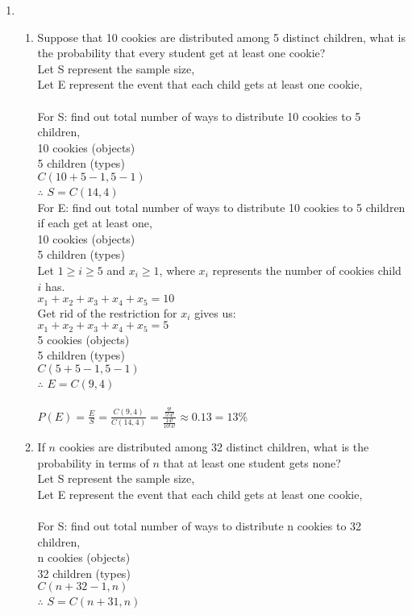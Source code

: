 \documentclass{article}
\begin{document}
\begin{enumerate}
\item 
\begin{enumerate}

\item Suppose that 10 cookies are distributed among 5 distinct children, what is the probability that every student get at least one cookie?\\

Let S represent the sample size,\\
Let E represent the event that each child gets at least one cookie,\\\\
For S: find out total number of ways to distribute 10 cookies to 5 children,\\
10 cookies (objects)\\
5 children (types)\\
$C(10 + 5 - 1, 5-1)$\\
$\therefore$ $S = C(14, 4)$\\

For E: find out total number of ways to distribute 10 cookies to 5 children if each get at least one,\\
10 cookies (objects)\\
5 children (types)\\
Let $1 \geq i \geq 5$ and $x_{i} \geq 1$, where $x_{i}$ represents the number of cookies child $i$ has.\\
$x_{1} + x_{2} + x_{3} + x_{4} + x_{5} = 10$\\
Get rid of the restriction for $x_{i}$ gives us:\\
$x_{1} + x_{2} + x_{3} + x_{4} + x_{5} = 5$\\
5 cookies (objects)\\
5 children (types)\\
$C(5 + 5 - 1, 5-1)$\\
$\therefore$ $E = C(9, 4)$\\\\
$P(E) = \frac{E}{S} = \frac{C(9, 4)}{C(14, 4)} = \frac{\frac{9!}{5!4!}}{\frac{14!}{10!4!}} \approx 0.13 = 13\%$

\item If $n$ cookies are distributed among 32 distinct children, what is the probability in terms of $n$  that at least one student gets none? \\

Let S represent the sample size,\\
Let E represent the event that each child gets at least one cookie,\\\\
For S: find out total number of ways to distribute n cookies to 32 children,\\
n cookies (objects)\\
32 children (types)\\
$C(n + 32 - 1, n)$\\
$\therefore$ $S = C(n + 31, n)$\\


\end{enumerate}
\end{enumerate}
\end{document}
